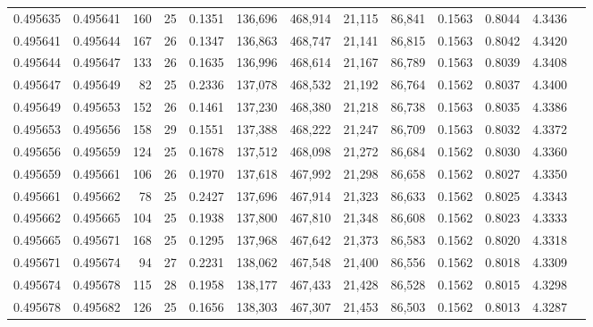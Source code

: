 \begin{tabular}{rrrrrrrrrrrrr}
0.495635 & 0.495641 & 160 &  25 &                                     0.1351 & 136,696 & 468,914 &  21,115 &  86,841 & 0.1563 & 0.8044 & 4.3436 \\
0.495641 & 0.495644 & 167 &  26 &                                     0.1347 & 136,863 & 468,747 &  21,141 &  86,815 & 0.1563 & 0.8042 & 4.3420 \\
0.495644 & 0.495647 & 133 &  26 &                                     0.1635 & 136,996 & 468,614 &  21,167 &  86,789 & 0.1563 & 0.8039 & 4.3408 \\
0.495647 & 0.495649 &  82 &  25 &                                     0.2336 & 137,078 & 468,532 &  21,192 &  86,764 & 0.1562 & 0.8037 & 4.3400 \\
0.495649 & 0.495653 & 152 &  26 &                                     0.1461 & 137,230 & 468,380 &  21,218 &  86,738 & 0.1563 & 0.8035 & 4.3386 \\
0.495653 & 0.495656 & 158 &  29 &                                     0.1551 & 137,388 & 468,222 &  21,247 &  86,709 & 0.1563 & 0.8032 & 4.3372 \\
0.495656 & 0.495659 & 124 &  25 &                                     0.1678 & 137,512 & 468,098 &  21,272 &  86,684 & 0.1562 & 0.8030 & 4.3360 \\
0.495659 & 0.495661 & 106 &  26 &                                     0.1970 & 137,618 & 467,992 &  21,298 &  86,658 & 0.1562 & 0.8027 & 4.3350 \\
0.495661 & 0.495662 &  78 &  25 &                                     0.2427 & 137,696 & 467,914 &  21,323 &  86,633 & 0.1562 & 0.8025 & 4.3343 \\
0.495662 & 0.495665 & 104 &  25 &                                     0.1938 & 137,800 & 467,810 &  21,348 &  86,608 & 0.1562 & 0.8023 & 4.3333 \\
0.495665 & 0.495671 & 168 &  25 &                                     0.1295 & 137,968 & 467,642 &  21,373 &  86,583 & 0.1562 & 0.8020 & 4.3318 \\
0.495671 & 0.495674 &  94 &  27 &                                     0.2231 & 138,062 & 467,548 &  21,400 &  86,556 & 0.1562 & 0.8018 & 4.3309 \\
0.495674 & 0.495678 & 115 &  28 &                                     0.1958 & 138,177 & 467,433 &  21,428 &  86,528 & 0.1562 & 0.8015 & 4.3298 \\
0.495678 & 0.495682 & 126 &  25 &                                     0.1656 & 138,303 & 467,307 &  21,453 &  86,503 & 0.1562 & 0.8013 & 4.3287 \\

\end{tabular}

